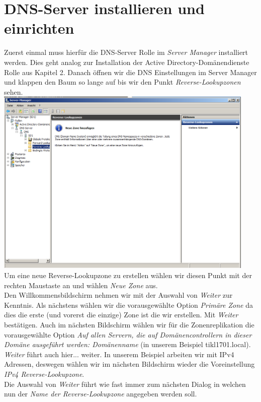 \documentclass[12pt,a4paper,titlepage]{scrartcl} %
\begin{document}
\newpage
\section{DNS-Server installieren und einrichten}
Zuerst einmal muss hierfür die DNS-Server Rolle im \emph{Server Manager} installiert werden. Dies geht analog zur Installation der Active Directory-Domänendienste Rolle aus Kapitel 2. Danach öffnen wir die DNS Einstellungen im Server Manager und klappen den Baum so lange auf bis wir den Punkt \emph{Reverse-Lookupzonen} sehen.\\

	\includegraphics[height=9cm]{Bilder/029(DNS01)}\\

Um eine neue Reverse-Lookupzone zu erstellen wählen wir diesen Punkt mit der rechten Maustaste an und wählen \emph{Neue Zone} aus.\\
Den Willkommensbildschirm nehmen wir mit der Auswahl von \emph{Weiter} zur Kenntnis. Als nächstens wählen wir die vorausgewählte Option \emph{Primäre Zone} da dies die erste (und vorerst die einzige) Zone ist die wir erstellen. Mit \emph{Weiter} bestätigen. Auch im nächsten Bildschirm wählen wir für die Zonenreplikation die vorausgewählte Option \emph{Auf allen Servern, die auf Domänencontrollern in dieser Domäne ausgeführt werden: \textit{Domänenname}} (in unserem Beispiel tikl1701.local). \emph{Weiter} führt auch hier... weiter. In unserem Beispiel arbeiten wir mit IPv4 Adressen, deswegen wählen wir im nächsten Bildschirm wieder die Voreinstellung \emph{IPv4 Reverse-Lookupzone}.\\
Die Auswahl von \emph{Weiter} führt wie fast immer zum nächsten Dialog in welchen nun der \emph{Name der Reverse-Lookupzone} angegeben werden soll.\\
\end{document}
